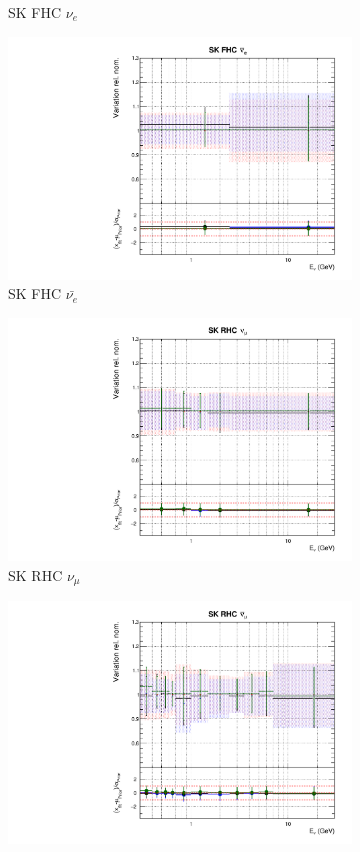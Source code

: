 \begin{figure}[t]
\begin{subfigure}{0.24\textwidth}
  \caption{SK FHC $\nu_e$}
\end{subfigure}
\begin{subfigure}{0.24\textwidth}
  \centering
  \includegraphics[width=0.95\linewidth]{figs/hptpcfitsflux_11}
  \caption{SK FHC $\bar{\nu_e}$}
\end{subfigure}
\begin{subfigure}{0.24\textwidth}
  \centering
  \includegraphics[width=0.95\linewidth]{figs/hptpcfitsflux_12}
  \caption{SK RHC $\nu_{\mu}$}
\end{subfigure}
\begin{subfigure}{0.24\textwidth}
  \centering
  \includegraphics[width=0.95\linewidth]{figs/hptpcfitsflux_13}

\end{subfigure}
\end{figure}
